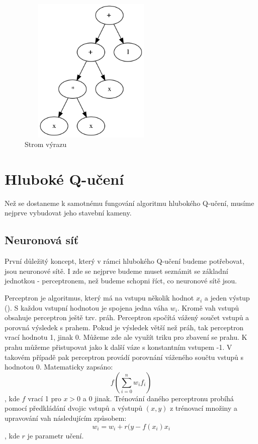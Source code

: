 \begin{figure}[H]\centering
\includegraphics[width=70mm, height=70mm]{./Obrazky/formule_graph_2.png}
\caption{Strom výrazu}
\label{obr04:GrafFormule}
\end{figure}



\newpage
\section{Hluboké Q-učení}
Než se dostaneme k samotnému fungování algoritmu hlubokého Q-učení, musíme nejprve vybudovat jeho stavební kameny.

\subsection{Neuronová síť}
První důležitý koncept, který v rámci hlubokého Q-učení budeme potřebovat, jsou neuronové sítě. 
I zde se nejprve budeme muset seznámit se základní jednotkou - perceptronem, než budeme schopni říct, co neuronové sítě jsou.
\par
Perceptron je algoritmus, který má na vstupu několik hodnot $x_i$ a jeden výstup (\cite{perceptronNeuralNetworks}). S každou vstupní hodnotou je spojena jedna váha $w_i$.
Kromě vah vstupů obsahuje perceptron ještě tzv. práh. Perceptron spočítá vážený součet vstupů a porovná výsledek s prahem. Pokud je výsledek větší než práh, tak perceptron vrací hodnotu 1, jinak 0.
Můžeme zde ale využít triku pro zbavení se prahu. K prahu můžeme přistupovat jako k další váze s konstantním vstupem -1.
V takovém případě pak perceptron provádí porovnání váženého součtu vstupů s hodnotou 0. 
\newline
Matematicky zapsáno:
\[f(\sum_{i=0}^{n} w_if_i)\], kde $f$ vrací 1 pro $x>0$ a 0 jinak.
Trénování daného perceptronu probíhá pomocí předkládání dvojic vstupů a výstupů $(x,y)$ z trénovací množiny a upravování vah následujícím způsobem:
\newline
\[w_i = w_i + r(y-f(x_i)x_i\], kde $r$ je parametr učení.

